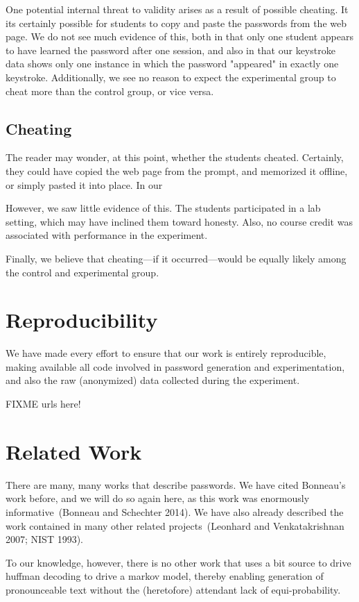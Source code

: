 \documentclass[preprint]{soups}
\newcommand{\sectionNewpage}{}
\let\SOriginalthesubsection\thesubsection
\let\SOriginalthesubsubsection\thesubsubsection
\newcommand{\Ssection}[2]{\section[#1]{#2}\let\thesubsection\SOriginalthesubsection}
\newcommand{\Ssubsection}[2]{\subsection[#1]{#2}\let\thesubsubsection\SOriginalthesubsubsection}
\begin{document}
One potential internal threat to validity arises as a result of possible
cheating. It its certainly possible for students to copy and paste the
passwords from the web page. We do not see much evidence of this, both
in that only one student appears to have learned the password after one
session, and also in that our keystroke data shows only one instance in
which the password "appeared" in exactly one keystroke. Additionally,
we see no reason to expect the experimental group to cheat more than
the control group, or vice versa.

\Ssubsection{Cheating}{Cheating}\label{t:x28part_x22Cheatingx22x29}

The reader may wonder, at this point, whether the students
cheated. Certainly, they could have copied the web page from
the prompt, and memorized it offline, or simply pasted it
into place. In our

However, we saw little evidence of this. The students
participated in a lab setting, which may have inclined them
toward honesty. Also, no course credit was associated with
performance in the experiment.

Finally, we believe that cheating{---}if it occurred{---}would
be equally likely among the control and experimental group.

\sectionNewpage

\Ssection{Reproducibility}{Reproducibility}\label{t:x28part_x22Reproducibilityx22x29}

We have made every effort to ensure that our work is
entirely reproducible, making available all code involved in
password generation and experimentation, and also the raw
(anonymized) data collected during the experiment.

FIXME urls here!

\sectionNewpage

\Ssection{Related Work}{Related Work}\label{t:x28part_x22Relatedx5fWorkx22x29}

There are many, many works that describe passwords. We have
cited Bonneau{'}s work before, and we will do so again here,
as this work was enormously informative~(Bonneau and Schechter 2014). We
have also already described the work contained in many other
related projects~(Leonhard and Venkatakrishnan 2007; NIST 1993).

To our knowledge, however, there is no other work that uses
a bit source to drive huffman decoding to drive a markov
model, thereby enabling generation of pronounceable text
without the (heretofore) attendant lack of
equi{-}probability.
\end{document}
